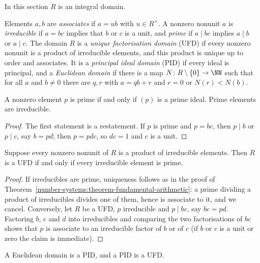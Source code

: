 In this section $R$ is an integral domain.

\begin{definition}\label{rings:definition-irreducible}
Elements $a, b$ are \emph{associates} if $a = ub$ with $u \in R^\times$. A nonzero
nonunit $a$ is \emph{irreducible} if $a = bc$ implies that $b$ or $c$ is a unit, and
\emph{prime} if $a \mid bc$ implies $a \mid b$ or $a \mid c$. The domain $R$ is a
\emph{unique factorisation domain} (UFD) if every nonzero nonunit is a product of
irreducible elements, and this product is unique up to order and associates. It is
a \emph{principal ideal domain} (PID) if every ideal is principal, and a
\emph{Euclidean domain} if there is a map $N \colon R \setminus \{0\} \to \NN$ such that
for all $a$ and $b \neq 0$ there are $q, r$ with $a = qb + r$ and $r = 0$ or $N(r) < N(b)$.
\end{definition}

\begin{lemma}\label{rings:lemma-prime-irreducible}
A nonzero element $p$ is prime if and only if $(p)$ is a prime ideal. Prime elements
are irreducible.
\end{lemma}

\begin{proof}
The first statement is a restatement. If $p$ is prime and $p = bc$, then $p \mid b$ or
$p \mid c$, say $b = pd$; then $p = pdc$, so $dc = 1$ and $c$ is a unit.
\end{proof}

\begin{lemma}\label{rings:lemma-ufd-criterion}
Suppose every nonzero nonunit of $R$ is a product of irreducible elements. Then $R$
is a UFD if and only if every irreducible element is prime.
\end{lemma}

\begin{proof}
If irreducibles are prime, uniqueness follows as in the proof of
Theorem~\ref{number-systems:theorem-fundamental-arithmetic}: a prime dividing a product
of irreducibles divides one of them, hence is associate to it, and we cancel.
Conversely, let $R$ be a UFD, $p$ irreducible and $p \mid bc$, say $bc = pd$. Factoring
$b$, $c$ and $d$ into irreducibles and comparing the two factorisations of $bc$ shows
that $p$ is associate to an irreducible factor of $b$ or of $c$ (if $b$ or $c$ is a unit
or zero the claim is immediate).
\end{proof}

\begin{theorem}\label{rings:theorem-euclidean-pid-ufd}
A Euclidean domain is a PID, and a PID is a UFD.
\end{theorem}

